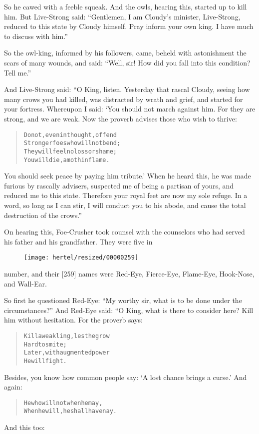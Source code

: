 \documentclass[article, twoside, 10pt]{memoir}
\renewenvironment{verbatim}{%
\begin{quote}%
\vskip -10pt%
\begin{alltt}\normalfont\small}{\end{alltt}%
\end{quote}%
\vskip -10pt
} %
\begin{document}
So he cawed with a feeble squeak. And the owls, hearing this,
started up to kill him. But Live-Strong said:
``Gentlemen, I am Cloudy's minister, Live-Strong, reduced to this state by Cloudy himself. Pray inform your own king. I have much to discuss with him.''

So the owl-king, informed by his followers, came, beheld with
astonishment the scars of many wounds, and said:
``Well, sir! How did you fall into this condition? Tell me.''

And Live-Strong said: “O King, listen. Yesterday that rascal
Cloudy, seeing how many crows you had killed, was distracted by
wrath and grief, and started for your fortress. Whereupon I said:
‘You should not march against him. For they are strong, and we are
weak. Now the proverb advises those who wish to thrive:

\begin{verbatim}
Do not, even in thought, offend
Stronger foes who will not bend;
They will feel no loss or shame;
You will die, a moth in flame.
\end{verbatim}
You should seek peace by paying him tribute.' When he heard this,
he was made furious by rascally advisers, suspected me of being a
partisan of yours, and reduced me to this state. Therefore your
royal feet are now my sole refuge. In a word, so long as I can
stir, I will conduct you to his abode, and cause the total
destruction of the crows.”

On hearing this, Foe-Crusher took counsel with the counselors who
had served his father and his grandfather. They were five in
\begin{figure}[p]\texttt{[image: hertel/resized/00000259]}\end{figure}number, and their [259] names were Red-Eye, Fierce-Eye, Flame-Eye,
Hook-Nose, and Wall-Ear.

So first he questioned Red-Eye:
``My worthy sir, what is to be done under the circumstances?'' And
Red-Eye said: “O King, what is there to consider here? Kill him
without hesitation. For the proverb says:

\begin{verbatim}
Kill a weakling, lest he grow
    Hard to smite;
Later, with augmented power
    He will fight.
\end{verbatim}
Besides, you know how common people say:
`A lost chance brings a curse.' And again:

\begin{verbatim}
He who will not when he may,
When he will, he shall have nay.
\end{verbatim}
And this too:
\end{document}
